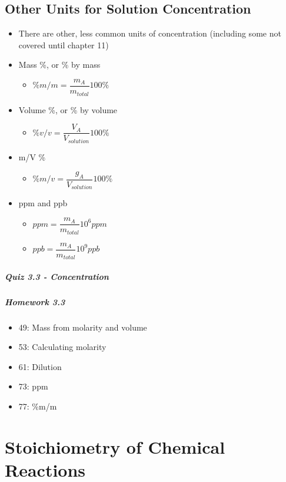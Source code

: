 \documentclass[12pt, openany, letterpaper]{memoir}
\begin{document}
\section{Other Units for Solution Concentration}
\begin{itemize}
  \item There are other, less common units of concentration (including some not covered until chapter 11)
  \item Mass \%, or \% by mass
  \begin{itemize}
    \item $\%m/m=\dfrac{m_A}{m_{total}}100\%$
  \end{itemize}
  \item Volume \%, or \% by volume
  \begin{itemize}
    \item $\%v/v=\dfrac{V_A}{V_{solution}}100\%$
  \end{itemize}
  \item m/V \%
  \begin{itemize}
    \item $\%m/v=\dfrac{g_A}{V_{solution}}100\%$
  \end{itemize}
  \item ppm and ppb
    \begin{itemize}
      \item $ppm=\dfrac{m_A}{m_{total}}10^6ppm$
      \item $ppb=\dfrac{m_A}{m_{total}}10^9ppb$
    \end{itemize}
\end{itemize}

\paragraph*{Quiz 3.3 - Concentration}
\paragraph*{Homework 3.3}
\begin{itemize}
  \item 49: Mass from molarity and volume
  \item 53: Calculating molarity
  \item 61: Dilution
  \item 73: ppm
  \item 77: \%m/m
\end{itemize}

\chapter{Stoichiometry of Chemical Reactions}
\end{document}
